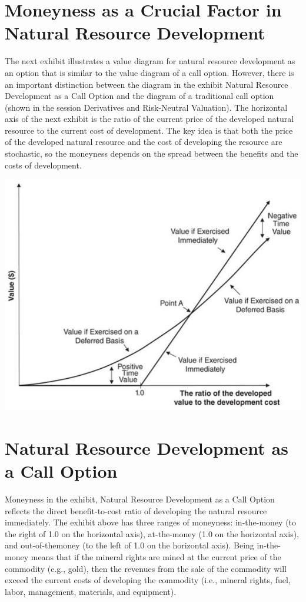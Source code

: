 \documentclass[11pt]{article}
\begin{document}
\section*{Moneyness as a Crucial Factor in Natural Resource Development}
The next exhibit illustrates a value diagram for natural resource development as an option that is similar to the value diagram of a call option. However, there is an important distinction between the diagram in the exhibit Natural Resource Development as a Call Option and the diagram of a traditional call option (shown in the session Derivatives and Risk-Neutral Valuation). The horizontal axis of the next exhibit is the ratio of the current price of the developed natural resource to the current cost of development. The key idea is that both the price of the developed natural resource and the cost of developing the resource are stochastic, so the moneyness depends on the spread between the benefits and the costs of development.

\begin{center}
\includegraphics[max width=\textwidth]{2024_04_10_c7d72f7af63ea46ad391g-3}
\end{center}

\section*{Natural Resource Development as a Call Option}
Moneyness in the exhibit, Natural Resource Development as a Call Option reflects the direct benefit-to-cost ratio of developing the natural resource immediately. The exhibit above has three ranges of moneyness: in-the-money (to the right of 1.0 on the horizontal axis), at-the-money (1.0 on the horizontal axis), and out-of-themoney (to the left of 1.0 on the horizontal axis). Being in-the-money means that if the mineral rights are mined at the current price of the commodity (e.g., gold), then the revenues from the sale of the commodity will exceed the current costs of developing the commodity (i.e., mineral rights, fuel, labor, management, materials, and equipment).
\end{document}
